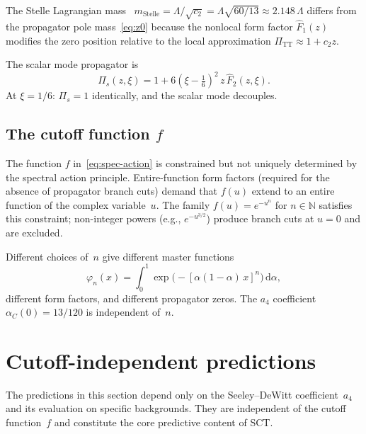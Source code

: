 \documentclass[12pt,a4paper]{article}
\theoremstyle{plain}
\theoremstyle{definition}
\theoremstyle{remark}
\newcommand{\dd}{\mathrm{d}}
\begin{document}
The Stelle Lagrangian mass~\cite{Stelle:1977} $m_{\mathrm{Stelle}} =
\Lambda/\sqrt{c_2} = \Lambda\sqrt{60/13} \approx 2.148\,
\Lambda$ differs from the propagator pole
mass~\eqref{eq:z0} because the nonlocal form factor
$\hat{F}_1(z)$ modifies the zero position relative to the
local approximation $\Pi_{\mathrm{TT}} \approx 1 + c_2 z$.

The scalar mode propagator is
\begin{equation}\label{eq:Pis}
  \Pi_s(z, \xi) = 1 + 6(\xi - \tfrac{1}{6})^2\,
  z\, \hat{F}_2(z, \xi).
\end{equation}
At $\xi = 1/6$: $\Pi_s = 1$ identically, and the scalar mode
decouples.

\subsection{The cutoff function $f$}
\label{sec:cutoff}

The function $f$ in~\eqref{eq:spec-action} is constrained but
not uniquely determined by the spectral action principle.
Entire-function form factors (required for the absence of
propagator branch cuts) demand that $f(u)$ extend to an entire
function of the complex variable~$u$.  The family
$f(u) = e^{-u^n}$ for $n \in \mathbb{N}$ satisfies this
constraint; non-integer powers (e.g., $e^{-u^{3/2}}$) produce
branch cuts at $u = 0$ and are excluded.

Different choices of~$n$ give different master functions
\begin{equation}\label{eq:phi-n}
  \varphi_n(x) = \int_0^1
  \exp\bigl(-[\alpha(1-\alpha)\, x]^n\bigr)\, \dd\alpha,
\end{equation}
different form factors, and different propagator zeros.
The $a_4$ coefficient $\alpha_C(0) = 13/120$ is independent
of~$n$.

\section{Cutoff-independent predictions}
\label{sec:robust}

The predictions in this section depend only on the
Seeley--DeWitt coefficient~$a_4$ and its evaluation on
specific backgrounds.  They are independent of the cutoff
function~$f$ and constitute the core predictive content of SCT.
\end{document}
